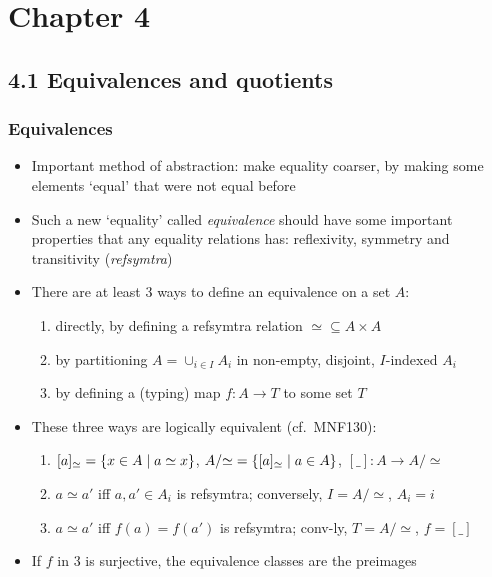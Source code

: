\documentclass[handout]{beamer}
\title[INF223 presentations]{}
\begin{document}
\section{Chapter 4}
\subsection{4.1 Equivalences and quotients}
 
\frame
  {   
    \frametitle{Equivalences}\label{Ch4:Eqvs}

 \begin{itemize}[<+->]
\item Important method of abstraction: make equality coarser, by making
some elements `equal' that were not equal before
\item Such a new `equality' called \emph{equivalence} should have some important 
properties that any equality relations has: reflexivity, symmetry and transitivity 
(\emph{refsymtra})
\item There are at least 3 ways to define an equivalence on a set $A$:
   \begin{enumerate}[<+->]
\item directly, by defining a refsymtra relation ${\simeq}\subseteq A\times A$
\item by partitioning $A = \cup_{i\in I} A_i $ in non-empty, disjoint, $I$-indexed $A_i$
\item by defining a (typing) map $f: A\to T$ to some set $T$
   \end{enumerate}
\item These three ways are logically equivalent (cf.\ MNF130): 
   \begin{enumerate}[<+->]
\item $[a]_\simeq = \{x\in A\mid a\simeq x\}$, 
$A/{\simeq}=\{[a]_\simeq \mid a\in A\}$, $[\_] : A \to A/{\simeq}$
\item $a\simeq a' $ iff $a,a' \in A_i$ is refsymtra; conversely, $I = A/{\simeq}$, $A_i = i$
\item $a\simeq a' $ iff $f(a)=f(a')$ is refsymtra; conv-ly,  $T = A/{\simeq}$, $f=[\_]$
   \end{enumerate}
\item If $f$ in 3 is surjective, the equivalence classes are the preimages
 \end{itemize}

 }
\end{document}
